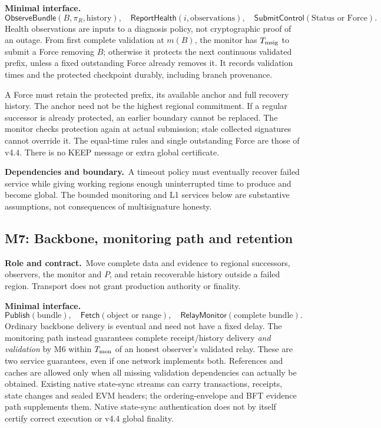 \documentclass[11pt,a4paper]{article}
\newcommand{\api}[1]{\ensuremath{\mathsf{#1}}}
\newcommand{\role}{\textbf{Role and contract.}\ }
\newcommand{\iface}{\textbf{Minimal interface.}\ }
\newcommand{\depends}{\textbf{Dependencies and boundary.}\ }
\begin{document}
\iface
\[
 \api{ObserveBundle}(B,\pi_R,\text{history}),\quad
 \api{ReportHealth}(i,\text{observations}),\quad
 \api{SubmitControl}(\text{Status or Force}).
\]
Health observations are inputs to a diagnosis policy, not cryptographic
proof of an outage. From first complete validation at $m(B)$, the monitor
has $T_{\rm msig}$ to submit a Force removing $B$; otherwise it protects
the next continuous validated prefix, unless a fixed outstanding Force
already removes it. It records validation times and the protected
checkpoint durably, including branch provenance.

A Force must retain the protected prefix, its available anchor and full
recovery history. The anchor need not be the highest regional commitment.
If a regular successor is already protected, an earlier boundary cannot
be replaced. The monitor checks protection again at actual submission;
stale collected signatures cannot override it. The equal-time rules and
single outstanding Force are those of v4.4. There is no KEEP message or
extra global certificate.

\depends A timeout policy must eventually recover failed service while
giving working regions enough uninterrupted time to produce and become
global. The bounded monitoring and L1 services below are substantive
assumptions, not consequences of multisignature honesty.

\subsection{M7: Backbone, monitoring path and retention}\label{sec:transport}
\role Move complete data and evidence to regional successors, observers,
the monitor and $P$, and retain recoverable history outside a failed
region. Transport does not grant production authority or finality.

\iface
\[
 \api{Publish}(\text{bundle}),\quad
 \api{Fetch}(\text{object or range}),\quad
 \api{RelayMonitor}(\text{complete bundle}).
\]
Ordinary backbone delivery is eventual and need not have a fixed delay.
The monitoring path instead guarantees complete receipt/history delivery
\emph{and validation} by M6 within $T_{\rm mon}$ of an honest observer's
validated relay. These are two service guarantees, even if one network
implements both. References and caches are allowed only when all missing
validation dependencies can actually be obtained.
Existing native state-sync streams can carry transactions, receipts,
state changes and sealed EVM headers; the ordering-envelope and BFT
evidence path supplements them. Native state-sync authentication does
not by itself certify correct execution or v4.4 global finality.
\end{document}
